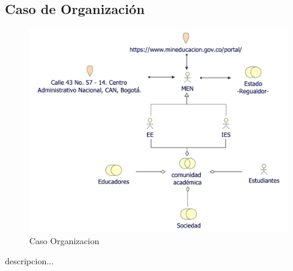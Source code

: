 \newpage
\subsection{Caso  de Organización}
\begin{figure}[h!]
	\centering
	\includegraphics[width=.9\linewidth]{imgs/caso/negocio/organizacion}
	\caption{Caso Organizacion}
\end{figure}
descripcion...
